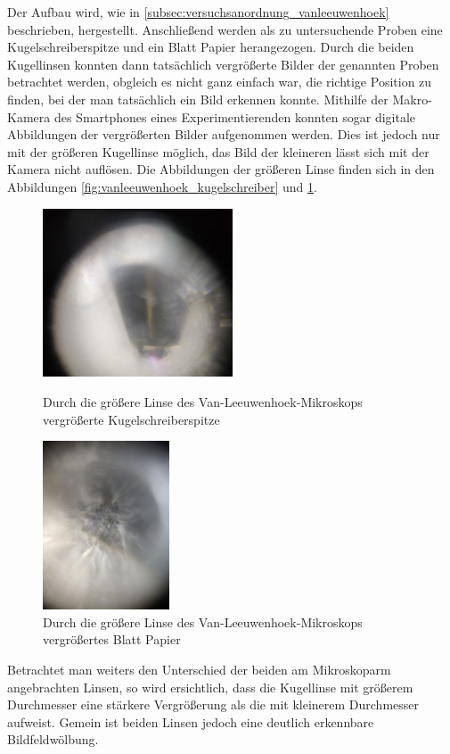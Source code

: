 \documentclass[english, ngerman]{scrartcl}
\begin{document}
Der Aufbau wird, wie in \autoref{subsec:versuchsanordnung_vanleeuwenhoek} beschrieben, hergestellt. Anschließend werden als zu untersuchende Proben eine Kugelschreiberspitze und ein Blatt Papier herangezogen. Durch die beiden Kugellinsen konnten dann tatsächlich vergrößerte Bilder der genannten Proben betrachtet werden, obgleich es nicht ganz einfach war, die richtige Position zu finden, bei der man tatsächlich ein Bild erkennen konnte. Mithilfe der Makro-Kamera des Smartphones eines Experimentierenden konnten sogar digitale Abbildungen der vergrößerten Bilder aufgenommen werden. Dies ist jedoch nur mit der größeren Kugellinse möglich, das Bild der kleineren lässt sich mit der Kamera nicht auflösen. Die Abbildungen der größeren Linse finden sich in den Abbildungen \ref{fig:vanleeuwenhoek_kugelschreiber} und \ref{fig:vanleeuwenhoek_papier}.
%
\setcapindent{0pt}
\begin{figure}[H]
    \centering
    \begin{minipage}[t]{0.49\linewidth}
    \centering
    \includegraphics[height=5cm]{fig/Kulli.jpeg}
    \caption[Kugelschreiberspitze durch Van-Leeuwenhoek-Mikroskop]{Durch die größere Linse des Van-Leeuwenhoek-Mikroskops vergrößerte Kugelschreiberspitze}
    \label{fig:vanleeuwenhoek_kugelschreiber}
    \end{minipage}%
    \hspace*{0.02\linewidth}
    \begin{minipage}[t]{0.49\linewidth}
    \centering
    \includegraphics[height=5cm]{fig/papier_gross.jpeg}
    \caption[Blatt Papier durch Van-Leeuwenhoek-Mikroskop]{Durch die größere Linse des Van-Leeuwenhoek-Mikroskops vergrößertes Blatt Papier}
    \label{fig:vanleeuwenhoek_papier}
    \end{minipage}
    \end{figure}
\setcaphanging
%
Betrachtet man weiters den Unterschied der beiden am Mikroskoparm angebrachten Linsen, so wird ersichtlich, dass die Kugellinse mit größerem Durchmesser eine stärkere Vergrößerung als die mit kleinerem Durchmesser aufweist. Gemein ist beiden Linsen jedoch eine deutlich erkennbare Bildfeldwölbung.
\end{document}
